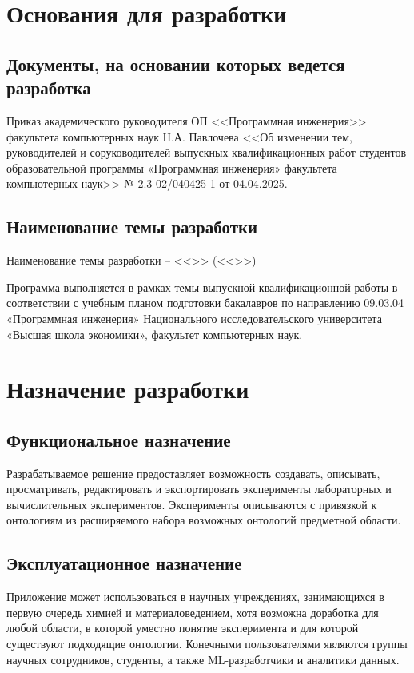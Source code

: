 \documentclass[a4paper,12pt,reqno]{article}
\begin{document}
    \section{Основания для разработки}

    \subsection{Документы, на основании которых ведется разработка}
    Приказ академического руководителя ОП <<Программная инженерия>> факультета компьютерных наук Н.А. Павлочева <<Об изменении тем, руководителей и соруководителей выпускных квалификационных работ студентов образовательной программы «Программная инженерия» факультета компьютерных наук>> № 2.3-02/040425-1 от 04.04.2025.

    \subsection{Наименование темы разработки}
    Наименование темы разработки – <<\unskip>> (<<\unskip>>)

    Программа выполняется в рамках темы выпускной квалификационной работы в соответствии с учебным планом подготовки бакалавров по направлению 09.03.04 «Программная инженерия» Национального исследовательского университета «Высшая школа экономики», факультет компьютерных наук.
    \newpage


    \section{Назначение разработки}

    \subsection{Функциональное назначение}
    Разрабатываемое решение предоставляет возможность создавать, описывать, просматривать, редактировать и экспортировать эксперименты лабораторных и вычислительных экспериментов. Эксперименты описываются с привязкой к онтологиям из расширяемого набора возможных онтологий предметной области.

    \subsection{Эксплуатационное назначение}
    Приложение может использоваться в научных учреждениях, занимающихся в первую очередь химией и материаловедением, хотя возможна доработка для любой области, в которой уместно понятие эксперимента и для которой существуют подходящие онтологии. Конечными пользователями являются группы научных сотрудников, студенты, а также ML-разработчики и аналитики данных.
    \newpage
\end{document}
